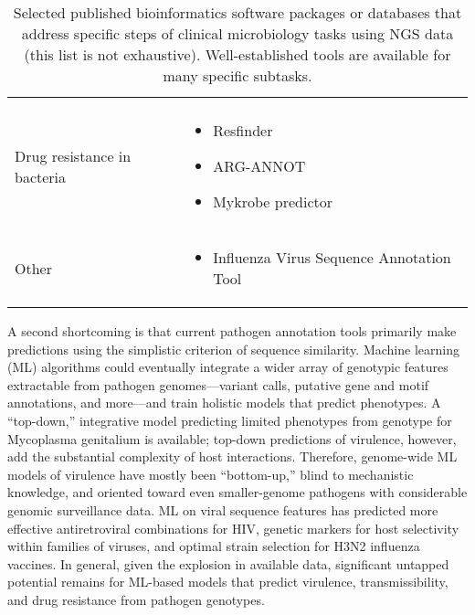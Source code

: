 \begin{table}[ht]
\begin{tabular}{l l}
\begin{minipage}[t]{5cm}
      \smallskip
    \end{minipage}
    \\
    \-\tabindent Drug resistance in bacteria &
    \begin{minipage}[t]{5cm}
      \raggedright
      \begin{itemize}[noitemsep]
      \item Resfinder
      \item ARG-ANNOT
      \item Mykrobe predictor
      \end{itemize}
      \smallskip
    \end{minipage}
    \\
    \-\tabindent Other &
    \begin{minipage}[t]{5cm}
      \raggedright
      \begin{itemize}[noitemsep]
      \item Influenza Virus Sequence Annotation Tool
      \end{itemize}
      \smallskip
    \end{minipage}
    \\
    \bottomrule
  \end{tabular}
  \caption[Bioinformatics tools for infectious diseases]{Selected published bioinformatics software packages or databases that address specific steps of clinical microbiology tasks using NGS data (this list is not exhaustive). Well-established tools are available for many specific subtasks.}
  \label{tab:id_bioinf_tools}
\end{table}

A second shortcoming is that current pathogen annotation tools primarily make predictions using the simplistic criterion of sequence similarity. Machine learning (ML) algorithms could eventually integrate a wider array of genotypic features extractable from pathogen genomes—variant calls, putative gene and motif annotations, and more—and train holistic models that predict phenotypes. A “top-down,” integrative model predicting limited phenotypes from genotype for Mycoplasma genitalium is available;\autocite{Karr2012} top-down predictions of virulence, however, add the substantial complexity of host interactions. Therefore, genome-wide ML models of virulence have mostly been “bottom-up,” blind to mechanistic knowledge, and oriented toward even smaller-genome pathogens with considerable genomic surveillance data. ML on viral sequence features has predicted more effective antiretroviral combinations for HIV,\autocite{Lengauer2006,Zazzi2012} genetic markers for host selectivity within families of viruses,\autocite{Raj2011a} and optimal strain selection for H3N2 influenza vaccines.\autocite{Luksza2014} In general, given the explosion in available data, significant untapped potential remains for ML-based models that predict virulence, transmissibility, and drug resistance from pathogen genotypes. 

